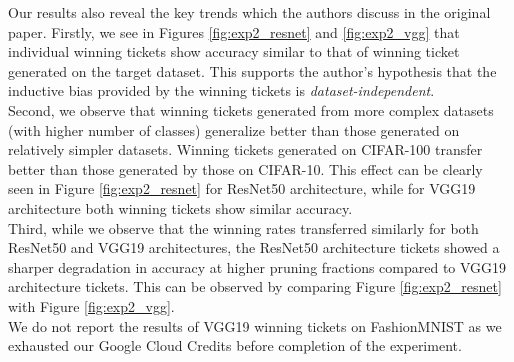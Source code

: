     Our results also reveal the key trends which the authors discuss in the original paper. Firstly, we see in Figures \ref{fig:exp2_resnet} and \ref{fig:exp2_vgg} that individual winning tickets show accuracy similar to that of winning ticket generated on the target dataset. This supports the author's hypothesis that the inductive bias provided by the winning tickets is \textit{dataset-independent}.\\
    
    Second, we observe that winning tickets generated from more complex datasets (with higher number of classes) generalize better than those generated on relatively simpler datasets. Winning tickets generated on CIFAR-100 transfer better than those generated by those on CIFAR-10. This effect can be clearly seen in Figure \ref{fig:exp2_resnet} for ResNet50 architecture, while for VGG19 architecture both winning tickets show similar accuracy.\\
    
    Third, while we observe that the winning rates transferred similarly for both ResNet50 and VGG19 architectures, the ResNet50 architecture tickets showed a sharper degradation in accuracy at higher pruning fractions compared to VGG19 architecture tickets. This can be observed by comparing Figure \ref{fig:exp2_resnet} with Figure \ref{fig:exp2_vgg}.\\
    
    We do not report the results of VGG19 winning tickets on FashionMNIST as we exhausted our Google Cloud Credits before completion of the experiment. 



